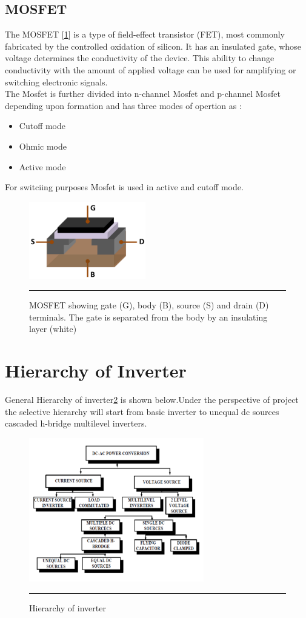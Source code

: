 \subsection{MOSFET}
The MOSFET [\ref{fig:2}] is a type of field-effect transistor (FET), most commonly fabricated by the controlled oxidation of silicon. It has an insulated gate, whose voltage determines the conductivity of the device. This ability to change conductivity with the amount of applied voltage can be used for amplifying or switching electronic signals.\\
The Mosfet is further divided into n-channel Mosfet and p-channel Mosfet depending upon formation and has three modes of opertion as :
\begin{itemize}
\item Cutoff mode
\item Ohmic mode
\item Active mode
\end{itemize}
For switciing purposes Mosfet is used in active and cutoff mode.
  \begin{figure}[htbp]
	\centering
		\includegraphics[width = 2in]{./Figures/Mosfet.pdf}
		\rule{35em}{5pt}
	\caption{ MOSFET showing gate (G), body (B), source (S) and drain (D) terminals. The gate is separated from the body by an insulating layer (white)}
	\label{fig:2}
\end{figure}
\section{Hierarchy of Inverter}
General Hierarchy of inverter\ref{fig:3} is shown below.Under the perspective of project the selective hierarchy will start from basic inverter to unequal dc sources cascaded h-bridge multilevel inverters.   
\begin{figure}[htbp]
	\centering
		\includegraphics[width = 3in]{./Figures/Picture2.pdf}
		\rule{35em}{5pt}
	\caption{Hierarchy of inverter}
	\label{fig:3}
\end{figure}
